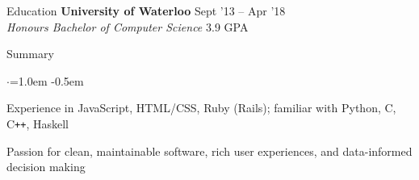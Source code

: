 \documentclass{resume} %
\begin{document}

\begin{rSection}{Education}
  {\bf University of Waterloo} \hfill {Sept '13 -- Apr '18} \\
  {\em Honours Bachelor of Computer Science} \hfill {3.9 GPA}
\end{rSection}

\vspace{0.5em}


\begin{rSection}{Summary}
  \vspace {0.5em}
  \begin{list}{$\cdot$}{\leftmargin=1.0em}
    \itemsep -0.5em \vspace{-0.5em}
    \item Experience in JavaScript, HTML/CSS, Ruby (Rails); familiar with Python, C, C\texttt{++}, Haskell
    \item Passion for clean, maintainable software, rich user experiences, and data-informed decision making
  \end{list}
  \vspace{0.5em}
\end{rSection}

\end{document}
